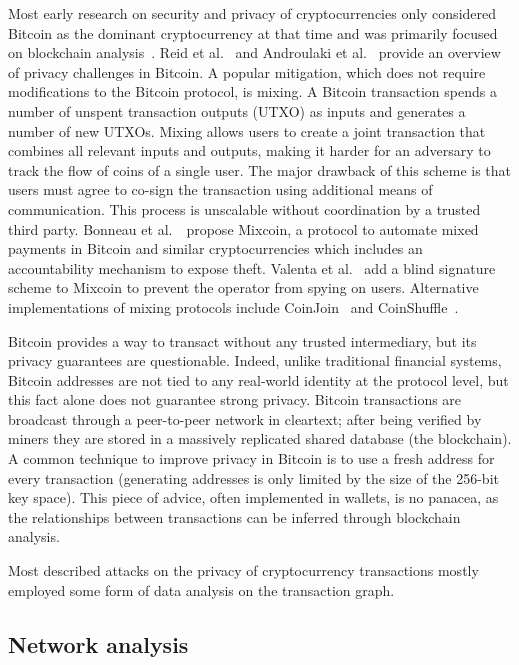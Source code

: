 Most early research on security and privacy of cryptocurrencies only considered Bitcoin as the dominant cryptocurrency at that time and was primarily focused on blockchain analysis~\cite{Meiklejohn2013, Ober2013, Ron2013}.
Reid et al.~\cite{Reid2011} and Androulaki et al.~\cite{Androulaki2013} provide an overview of privacy challenges in Bitcoin.
A popular mitigation, which does not require modifications to the Bitcoin protocol, is mixing.
A Bitcoin transaction spends a number of unspent transaction outputs (UTXO) as inputs and generates a number of new UTXOs.
Mixing allows users to create a joint transaction that combines all relevant inputs and outputs, making it harder for an adversary to track the flow of coins of a single user.
The major drawback of this scheme is that users must agree to co-sign the transaction using additional means of communication.
This process is unscalable without coordination by a trusted third party.
Bonneau et al.~\cite{Bonneau2014}~propose Mixcoin, a protocol to automate mixed payments in Bitcoin and similar cryptocurrencies which includes an accountability mechanism to expose theft.
Valenta et al.~\cite{Valenta2015} add a blind signature scheme to Mixcoin to prevent the operator from spying on users.
Alternative implementations of mixing protocols include CoinJoin~\cite{Maxwell2013} and CoinShuffle~\cite{Ruffing2014}.

Bitcoin provides a way to transact without any trusted intermediary, but its privacy guarantees are questionable.
Indeed, unlike traditional financial systems, Bitcoin addresses are not tied to any real-world identity at the protocol level, but this fact alone does not guarantee strong privacy.
Bitcoin transactions are broadcast through a peer-to-peer network in cleartext; after being verified by miners they are stored in a massively replicated shared database (the blockchain).
A common technique to improve privacy in Bitcoin is to use a fresh address for every transaction (generating addresses is only limited by the size of the 256-bit key space).
This piece of advice, often implemented in wallets, is no panacea, as the relationships between transactions can be inferred through blockchain analysis.

Most described attacks on the privacy of cryptocurrency transactions mostly employed some form of data analysis on the transaction graph.

\subsection{Network analysis}

